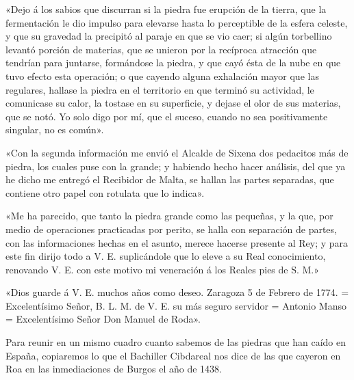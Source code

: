 \documentclass[a4paper, 12pt, oneside, spanish]{article}
\begin{document}
«Dejo á los sabios que discurran si la piedra fue erupción de la tierra, que la fermentación le dio impulso para elevarse hasta lo perceptible de la esfera celeste, y que su gravedad la precipitó al paraje en que se vio caer; si algún torbellino levantó porción de materias, que se unieron por la recíproca atracción que tendrían para juntarse, formándose la piedra, y que cayó ésta de la nube en que tuvo efecto esta operación; o que cayendo alguna exhalación mayor que las regulares, hallase la piedra en el territorio en que terminó su actividad, le comunicase su calor, la tostase en su superficie, y dejase el olor de sus materias, que se notó. Yo solo digo por mí, que el suceso, cuando no sea positivamente singular, no es común».

«Con la segunda información me envió el Alcalde de Sixena dos pedacitos más de piedra, los cuales puse con la grande; y habiendo hecho hacer análisis, del que ya he dicho me entregó el Recibidor de Malta, se hallan las partes separadas, que contiene otro papel con rotulata que lo indica».

«Me ha parecido, que tanto la piedra grande como las pequeñas, y la que, por medio de operaciones practicadas por perito, se halla con separación de partes, con las informaciones hechas en el asunto, merece hacerse presente al Rey; y para este fin dirijo todo a V. E. suplicándole que lo eleve a su Real conocimiento, renovando V. E. con este motivo mi veneración á los Reales pies de S. M.»

«Dios guarde á V. E. muchos años como deseo. Zaragoza 5 de Febrero de 1774. = Excelentísimo Señor, B. L. M. de V. E. su más seguro servidor = Antonio Manso = Excelentísimo Señor Don Manuel de Roda».

Para reunir en un mismo cuadro cuanto sabemos de las piedras que han caído en España, copiaremos lo que el Bachiller Cibdareal nos dice de las que cayeron en Roa en las inmediaciones de Burgos el año de 1438.
\end{document}
